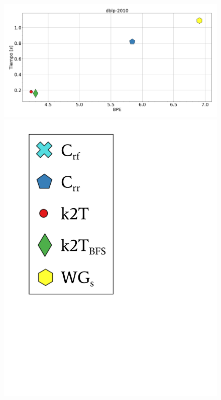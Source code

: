 \begin{figure}
    	\centering
    	\begin{minipage}{1\textwidth}
    			\centering
    			\begin{minipage}{0.8\textwidth}
    				\centering
    				\includegraphics[width=1\linewidth]{img/bpeTimes/secuencial/dblp-2010.pdf}
    			\end{minipage}
    			\begin{minipage}{0.15\textwidth}
    				\centering
    				\includegraphics[scale=.24, clip, trim=70 290 290 30]{img/bpeTimes/labelSec.pdf}
    			\end{minipage}
    			

\end{minipage}
\end{figure}
